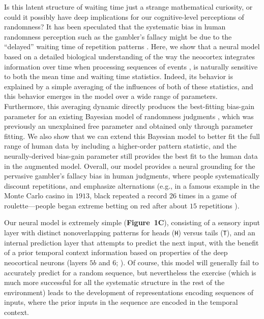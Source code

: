 \documentclass[11pt]{article}
\begin{document}
Is this latent structure of waiting time just a strange mathematical curiosity, or could it possibly have deep implications for our cognitive-level perceptions of randomness?
It has been speculated that the systematic bias in human randomness perception such as the gambler's fallacy \cite{Tversky1974} might be due to the ``delayed'' waiting time of repetition patterns \cite{Sun2010cogpsy,Sun2010jdm}.
Here, we show that a neural model based on a detailed biological understanding of the way the neocortex integrates information over time when processing sequences of events \cite{OReilly2014TI}, is naturally sensitive to both the mean time and waiting time statistics.
Indeed, its behavior is explained by a simple averaging of the influences of both of these statistics, and this behavior emerges in the model over a wide range of parameters.
Furthermore, this averaging dynamic directly produces the best-fitting bias-gain parameter for an existing Bayesian model of randomness judgments \cite{Griffiths2001}, which was previously an unexplained free parameter and obtained only through parameter fitting.
We also show that we can extend this Bayesian model to better fit the full range of human data by including a higher-order pattern statistic, and the neurally-derived bias-gain parameter still provides the best fit to the human data in the augmented model.
Overall, our model provides a neural grounding for the pervasive gambler's fallacy bias in human judgments, where people systematically discount repetitions, and emphasize alternations \cite{Falk1997,Nickerson2002}
(e.g., in a famous example in the Monte Carlo casino in $1913$, black repeated a record 26 times in a game of roulette---people began extreme betting on red after about $15$ repetitions \cite{HuffD1959}).

Our neural model is extremely simple (\textbf{Figure~1C}), consisting of a sensory input layer with distinct nonoverlapping patterns for heads (\texttt{H}) versus tails (\texttt{T}),
and an internal prediction layer that attempts to predict the next input, with the benefit of a prior temporal context information based on properties of the deep neocortical neurons (layers $5b$ and $6$; \cite{OReilly2014TI}).
Of course, this model will generally fail to accurately predict for a random sequence, but nevertheless the exercise (which is much more successful for all the systematic structure in the rest of the environment) leads to the development of representations encoding sequences of inputs, where the prior inputs in the sequence are encoded in the temporal context.
\end{document}

